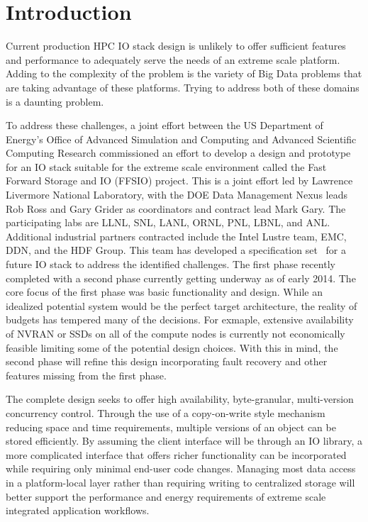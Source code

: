 \documentclass[conference]{IEEEtran}
\begin{document}


\section{Introduction}

Current production HPC IO stack design is unlikely to offer sufficient features
and performance to adequately serve the needs of an extreme scale platform.
Adding to the complexity of the problem is the variety of Big Data problems
that are taking advantage of these platforms. Trying to address both of these
domains is a daunting problem.

To address these challenges, a joint effort between the US Department of
Energy's Office of Advanced Simulation and Computing and Advanced Scientific
Computing Research commissioned an effort to develop a design and prototype for
an IO stack suitable for the extreme scale environment called the Fast Forward
Storage and IO (FFSIO) project. This is a joint effort led by Lawrence
Livermore National Laboratory, with the DOE Data Management Nexus leads Rob
Ross and Gary Grider as coordinators and contract lead Mark Gary. The
participating labs are LLNL, SNL, LANL, ORNL, PNL, LBNL, and ANL.  Additional
industrial partners contracted include the Intel Lustre team, EMC, DDN, and the
HDF Group. This team has developed a specification
set~\cite{fastforward:2014:docs} for a future IO stack to address the
identified challenges. The first phase recently completed with a second phase
currently getting underway as of early 2014. The core focus of the first phase
was basic functionality and design. While an idealized potential system would
be the perfect target architecture, the reality of budgets has tempered many of
the decisions. For exmaple, extensive availability of NVRAN or SSDs on all of
the compute nodes is currently not economically feasible limiting some of the
potential design choices.  With this in mind, the second phase will refine this
design incorporating fault recovery and other features missing from the first
phase.

The complete design seeks to offer high availability, byte-granular,
multi-version concurrency control. Through the use of a copy-on-write style
mechanism reducing space and time requirements, multiple versions of an object
can be stored efficiently. By assuming the client interface will be through an
IO library, a more complicated interface that offers richer functionality can
be incorporated while requiring only minimal end-user code changes.  Managing
most data access in a platform-local layer rather than requiring writing to
centralized storage will better support the performance and energy requirements
of extreme scale integrated application workflows.
\end{document}
